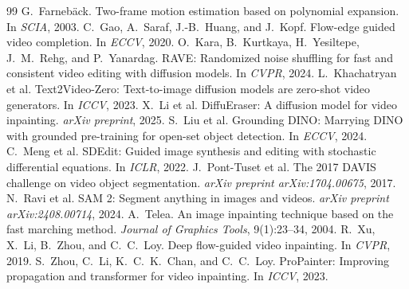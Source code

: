 \documentclass[11pt]{article}
\begin{document}
\begin{thebibliography}{99}
\small
{} G.~Farneb\"ack. Two-frame motion estimation based on polynomial expansion. In \emph{SCIA}, 2003.
 C.~Gao, A.~Saraf, J.-B.~Huang, and J.~Kopf. Flow-edge guided video completion. In \emph{ECCV}, 2020.
 O.~Kara, B.~Kurtkaya, H.~Yesiltepe, J.~M.~Rehg, and P.~Yanardag. RAVE: Randomized noise shuffling for fast and consistent video editing with diffusion models. In \emph{CVPR}, 2024.
 L.~Khachatryan et al. Text2Video-Zero: Text-to-image diffusion models are zero-shot video generators. In \emph{ICCV}, 2023.
 X.~Li et al. DiffuEraser: A diffusion model for video inpainting. \emph{arXiv preprint}, 2025.
 S.~Liu et al. Grounding DINO: Marrying DINO with grounded pre-training for open-set object detection. In \emph{ECCV}, 2024.
 C.~Meng et al. SDEdit: Guided image synthesis and editing with stochastic differential equations. In \emph{ICLR}, 2022.
 J.~Pont-Tuset et al. The 2017 DAVIS challenge on video object segmentation. \emph{arXiv preprint arXiv:1704.00675}, 2017.
 N.~Ravi et al. SAM 2: Segment anything in images and videos. \emph{arXiv preprint arXiv:2408.00714}, 2024.
 A.~Telea. An image inpainting technique based on the fast marching method. \emph{Journal of Graphics Tools}, 9(1):23--34, 2004.
 R.~Xu, X.~Li, B.~Zhou, and C.~C.~Loy. Deep flow-guided video inpainting. In \emph{CVPR}, 2019.
 S.~Zhou, C.~Li, K.~C.~K.~Chan, and C.~C.~Loy. ProPainter: Improving propagation and transformer for video inpainting. In \emph{ICCV}, 2023.
\end{thebibliography}
\end{document}
